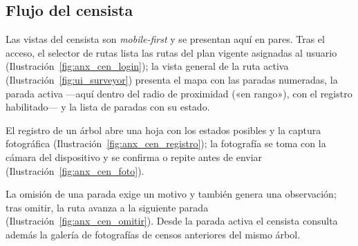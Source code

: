 

\subsection*{Flujo del censista}

Las vistas del censista son \textit{mobile-first} y se presentan aquí en pares. Tras el acceso,
el selector de rutas lista las rutas del plan vigente asignadas al usuario
(Ilustración~\ref{fig:anx_cen_login}); la vista general de la ruta activa
(Ilustración~\ref{fig:ui_surveyor}) presenta el mapa con las paradas numeradas, la parada activa
---aquí dentro del radio de proximidad («en rango»), con el registro habilitado--- y la lista de
paradas con su estado.



El registro de un árbol abre una hoja con los estados posibles y la captura fotográfica
(Ilustración~\ref{fig:anx_cen_registro}); la fotografía se toma con la cámara del dispositivo y se
confirma o repite antes de enviar (Ilustración~\ref{fig:anx_cen_foto}).



La omisión de una parada exige un motivo y también genera una observación; tras omitir, la ruta
avanza a la siguiente parada (Ilustración~\ref{fig:anx_cen_omitir}). Desde la parada activa el
censista consulta además la galería de fotografías de censos anteriores del mismo árbol.

